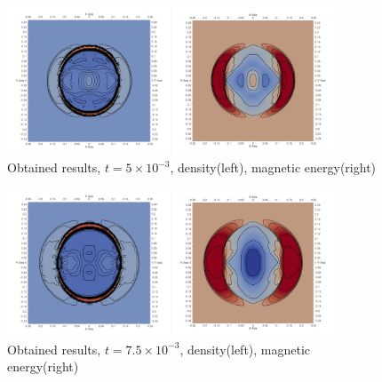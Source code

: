 \begin{figure}[H]
	\begin{center}
		\includegraphics[width=0.87\textwidth]{img//mhd-blast/old/my1.jpg}
	\caption{Obtained results, $t = 5\times 10^{-3}$, density(left), magnetic energy(right)}
	\label{figure:blastOldMy2}
	\end{center}
\end{figure}
\vspace{-5mm}

\begin{figure}[H]
	\begin{center}
		\includegraphics[width=0.87\textwidth]{img//mhd-blast/old/my2.jpg}
	\caption{Obtained results, $t = 7.5\times 10^{-3}$, density(left), magnetic energy(right)}
	\label{figure:blastOldMy3}
	\end{center}
\end{figure}
\vspace{-5mm}

